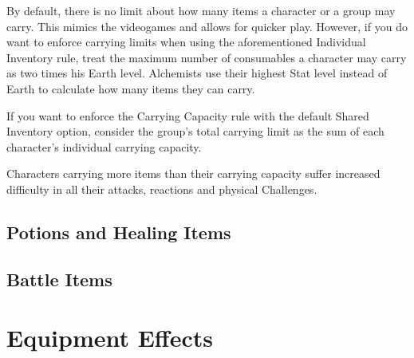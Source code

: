 \begin{multicols}{2}
\begin{boco}
By default, there is no limit about how many items a character or a group may carry. This mimics the videogames and allows for quicker play. However, if you do want to enforce carrying limits when using the aforementioned Individual Inventory rule, treat the maximum number of consumables a character may carry as two times his Earth level. Alchemists use their highest Stat level instead of Earth to calculate how many items they can carry. \pc%

If you want to enforce the Carrying Capacity rule with the default Shared Inventory option, consider the group's total carrying limit as the sum of each character's individual carrying capacity. \pc%

Characters carrying more items than their carrying capacity suffer increased difficulty in all their attacks, reactions and physical Challenges.

\end{boco}

\end{multicols}

\clearpage
\subsection{Potions and Healing Items}\label{subsec:potions}

\begin{tabitem}[label=inv-potions]
    
\end{tabitem}

\clearpage
\subsection{Battle Items}\label{subsec:battleitems}

\begin{tabitem}[label=inv-battles]
    
\end{tabitem}
\vfill
\begin{center}
\end{center}

\clearpage
\section{Equipment Effects}\label{sec:equipeffects}


